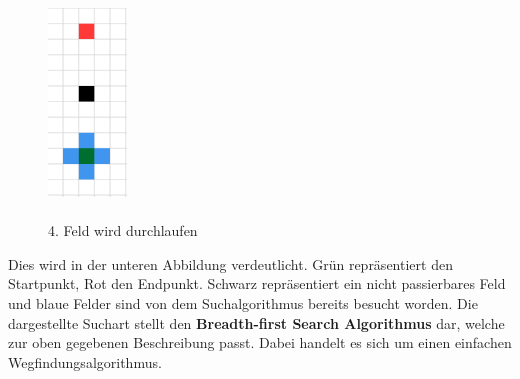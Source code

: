 {{{{\begin{figure}[H]
\begin{minipage}{0.5\textwidth}
				\end{minipage}
				\begin{minipage}{0.5\textwidth}
					\centering
					\includegraphics[height=5cm]{Bilder/pathfinding_procedure_4.png}
					\caption{\\ 4. Feld wird durchlaufen}
					\label{pic:pathfinding_procedure_4}
				\end{minipage}
			\end{figure}
			
			
			Dies wird in der unteren Abbildung verdeutlicht. Grün repräsentiert den Startpunkt, Rot den Endpunkt. Schwarz repräsentiert ein nicht passierbares Feld und blaue Felder sind von dem Suchalgorithmus bereits besucht worden. 
			Die dargestellte Suchart stellt den \textbf{Breadth-first Search Algorithmus} dar, welche zur oben gegebenen Beschreibung passt. Dabei handelt es sich um einen einfachen Wegfindungsalgorithmus.
			
}}}}
